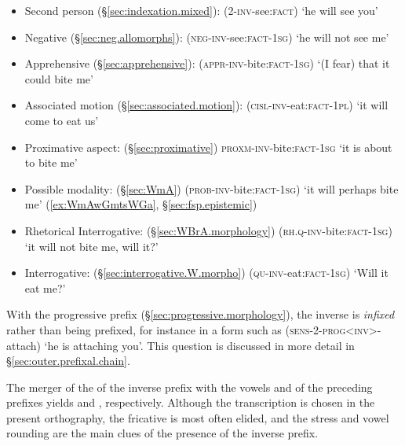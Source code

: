\begin{itemize}
	\item Second person  (§\ref{sec:indexation.mixed}):  (2-\textsc{inv}-see:\textsc{fact}) `he will see you'
	\item Negative  (§\ref{sec:neg.allomorphs}):  (\textsc{neg}-\textsc{inv}-see:\textsc{fact}-\textsc{1sg}) `he will not see me'
	\item Apprehensive  (§\ref{sec:apprehensive}):  (\textsc{appr}-\textsc{inv}-bite:\textsc{fact}-\textsc{1sg}) `(I fear) that it could bite me'
	\item Associated motion  (§\ref{sec:associated.motion}):  (\textsc{cisl}-\textsc{inv}-eat:\textsc{fact}-\textsc{1pl}) `it will come to eat us'
	\item Proximative aspect:  (§\ref{sec:proximative})  \textsc{proxm}-\textsc{inv}-bite:\textsc{fact}-\textsc{1sg} `it is about to bite me'
	\item Possible modality:  (§\ref{sec:WmA})  (\textsc{prob}-\textsc{inv}-bite:\textsc{fact}-\textsc{1sg}) `it will perhaps bite me' (\ref{ex:WmAwGmtsWGa}, §\ref{sec:fsp.epistemic})
	\item Rhetorical Interrogative:  (§\ref{sec:WBrA.morphology})  (\textsc{rh}.\textsc{q}-\textsc{inv}-bite:\textsc{fact}-\textsc{1sg}) `it will not bite me, will it?'
	\item Interrogative:  (§\ref{sec:interrogative.W.morpho})  (\textsc{qu}-\textsc{inv}-eat:\textsc{fact}-\textsc{1sg}) `Will it eat me?'
\end{itemize}


With the progressive prefix  (§\ref{sec:progressive.morphology}), the inverse is \textit{infixed} rather than being prefixed, for instance in a form such as  (\textsc{sens}-2-\textsc{prog}<\textsc{inv}>-attach) `he is attaching you'. This question is discussed in more detail in §\ref{sec:outer.prefixal.chain}.

The merger of the  of the inverse prefix with the vowels  and  of the preceding prefixes yields  and , respectively.  Although the transcription  is chosen in the present orthography, the fricative  is most often elided, and the stress and vowel rounding are the main clues of the presence of the inverse prefix. 

